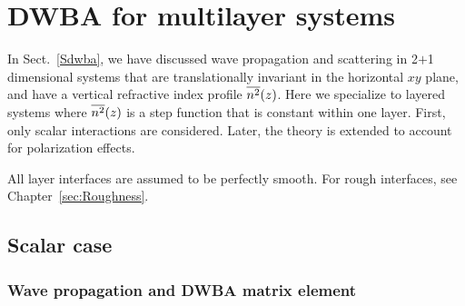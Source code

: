 

\chapter{DWBA for multilayer systems}  \label{sec:Multilayers}


%

In Sect.~\ref{Sdwba},
we have discussed wave propagation and scattering in 2$+$1 dimensional systems
that are translationally invariant in the horizontal $xy$ plane,
and have a vertical refractive index profile $\overline{n^2}(z)$.
Here we specialize to layered systems
where $\overline{n^2}(z)$ is a step function that is constant within one layer.
First, only scalar interactions are considered.
Later, the theory is extended to account for polarization effects.


All layer interfaces are assumed to be perfectly smooth.
For rough interfaces, see Chapter~\ref{sec:Roughness}.

\section{Scalar case}

\subsection{Wave propagation and DWBA matrix element}

